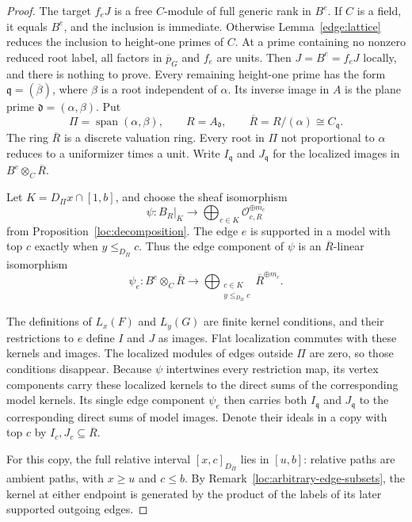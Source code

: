 \begin{proof}
The target \(f_eJ\) is a free \(C\)-module of full generic rank in
\(B^e\). If \(C\) is a field, it equals \(B^e\), and the inclusion is
immediate. Otherwise Lemma~\ref{edge:lattice} reduces the inclusion to
height-one primes of \(C\).
At a prime containing no nonzero reduced root label, all factors in
\(\overline p_G\) and \(f_e\) are units.
Then \(J=B^e=f_eJ\) locally, and there is nothing to prove.
Every remaining height-one prime has the form
\(\mathfrak q=(\overline\beta)\), where \(\beta\) is a root independent
of \(\alpha\). Its inverse image in \(A\) is the plane prime
\(\mathfrak d=(\alpha,\beta)\). Put
\[
 \Pi=\operatorname{span}(\alpha,\beta),\qquad
 R=A_{\mathfrak d},\qquad
 \overline R=R/(\alpha)\cong C_{\mathfrak q}.
\]
The ring \(\overline R\) is a discrete valuation ring. Every root in
\(\Pi\) not proportional to \(\alpha\) reduces to a uniformizer times
a unit. Write \(I_{\mathfrak q}\) and \(J_{\mathfrak q}\) for the
localized images in \(B^e\otimes_C\overline R\).

Let \(K=D_\Pi x\cap[1,b]\), and choose the sheaf isomorphism
\[
 \psi:B_R|_K\longrightarrow
       \bigoplus_{c\in K}\mathcal O_{c,R}^{\oplus m_c}
\]
from Proposition~\ref{loc:decomposition}. The edge \(e\) is supported
in a model with top \(c\) exactly when \(y\le_{D_\Pi}c\). Thus the
edge component of \(\psi\) is an \(\overline R\)-linear isomorphism
\[
 \psi_e:B^e\otimes_C\overline R
   \longrightarrow
   \bigoplus_{\substack{c\in K\\y\le_{D_\Pi}c}}
            \overline R^{\oplus m_c}.
\]

The definitions of \(L_x(F)\) and \(L_y(G)\) are finite kernel
conditions, and their restrictions to \(e\) define \(I\) and \(J\)
as images. Flat localization commutes with these kernels and images.
The localized modules of edges outside \(\Pi\) are zero, so those
conditions disappear. Because \(\psi\) intertwines every restriction
map, its vertex components carry these localized kernels to the direct
sums of the corresponding model kernels. Its single edge component
\(\psi_e\) then carries both \(I_{\mathfrak q}\) and
\(J_{\mathfrak q}\) to the corresponding direct sums of model images.
Denote their ideals in a copy with top \(c\) by
\(I_c,J_c\subseteq\overline R\).

For this copy, the full relative interval \([x,c]_{D_\Pi}\) lies in
\([u,b]\): relative paths are ambient paths, with \(x\ge u\) and
\(c\le b\). By Remark~\ref{loc:arbitrary-edge-subsets}, the kernel at
either endpoint is generated by the product of the labels of its later
supported outgoing edges.


\end{proof}
